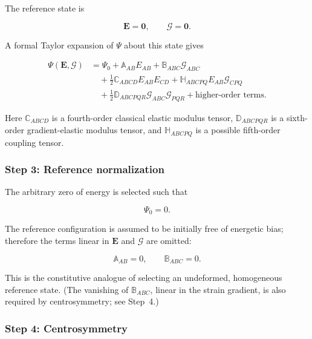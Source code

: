 \documentclass[11pt]{article}
\begin{document}
The reference state is

\begin{equation}
\mathbf{E}=\mathbf{0},
\qquad
\bm{\mathcal{G}}=\mathbf{0}.
\label{eq:sec2_reference_state}
\end{equation}

A formal Taylor expansion of $\Psi$ about this state gives

\begin{align}
\Psi(\mathbf{E},\bm{\mathcal{G}})
&=
\Psi_0
+
\mathbb{A}_{AB}E_{AB}
+
\mathbb{B}_{ABC}\mathcal{G}_{ABC}
\nonumber\\
&\quad
+
\frac{1}{2}\mathbb{C}_{ABCD}E_{AB}E_{CD}
+
\mathbb{H}_{ABCPQ}E_{AB}\mathcal{G}_{CPQ}
\nonumber\\
&\quad
+
\frac{1}{2}\mathbb{D}_{ABCPQR}\mathcal{G}_{ABC}\mathcal{G}_{PQR}
+
\text{higher-order terms}.
\label{eq:sec2_taylor_energy}
\end{align}

Here $\mathbb{C}_{ABCD}$ is a fourth-order classical elastic modulus tensor, $\mathbb{D}_{ABCPQR}$ is a sixth-order gradient-elastic modulus tensor, and $\mathbb{H}_{ABCPQ}$ is a possible fifth-order coupling tensor.

\subsubsection{Step 3: Reference normalization}

The arbitrary zero of energy is selected such that

\begin{equation}
\Psi_0=0.
\label{eq:sec2_zero_energy}
\end{equation}

The reference configuration is assumed to be initially free of energetic bias; therefore the terms linear in $\mathbf{E}$ and $\bm{\mathcal{G}}$ are omitted:

\begin{equation}
\mathbb{A}_{AB}=0,
\qquad
\mathbb{B}_{ABC}=0.
\label{eq:sec2_no_linear_terms}
\end{equation}

This is the constitutive analogue of selecting an undeformed, homogeneous reference state. (The vanishing of $\mathbb{B}_{ABC}$, linear in the strain gradient, is also required by centrosymmetry; see Step~4.)

\subsubsection{Step 4: Centrosymmetry}
\end{document}
